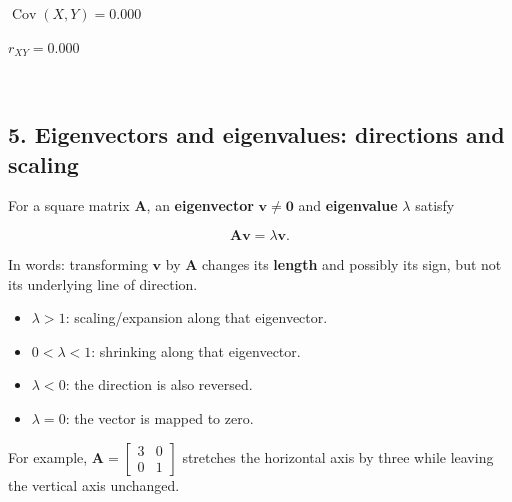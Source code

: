 \documentclass[11pt]{article}
\providecommand{\tightlist}{%
      \setlength{\itemsep}{0pt}\setlength{\parskip}{0pt}}
\begin{document}
    
    $\displaystyle \operatorname{Cov}(X,Y) = \boxed{0.000}$

    
    $\displaystyle r_{XY} = \boxed{0.000}$

    
    \begin{center}
    \end{center}
    { \hspace*{\fill} \\}
    

    \subsection{5. Eigenvectors and eigenvalues: directions and
scaling}\label{eigenvectors-and-eigenvalues-directions-and-scaling}

For a square matrix \(\mathbf A\), an \textbf{eigenvector}
\(\mathbf v\ne \mathbf 0\) and \textbf{eigenvalue} \(\lambda\) satisfy

\[\boxed{\mathbf A\mathbf v=\lambda\mathbf v}.\]

In words: transforming \(\mathbf v\) by \(\mathbf A\) changes its
\textbf{length} and possibly its sign, but not its underlying line of
direction.

\begin{itemize}
\tightlist
\item
  \(\lambda>1\): scaling/expansion along that eigenvector.
\item
  \(0<\lambda<1\): shrinking along that eigenvector.
\item
  \(\lambda<0\): the direction is also reversed.
\item
  \(\lambda=0\): the vector is mapped to zero.
\end{itemize}

For example,
\(\mathbf A=\left[\begin{smallmatrix}3&0\\0&1\end{smallmatrix}\right]\)
stretches the horizontal axis by three while leaving the vertical axis
unchanged.
\end{document}
